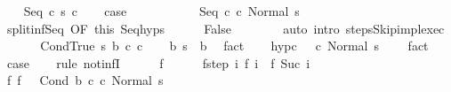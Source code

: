 \begin{isabellebody}
\isamarkupfalse%
\isanewline
\ \ \isamarkupfalse%
\ {\isacharparenleft}Seq\ c\ s\ c\isanewline
\ \ \isamarkupfalse%
\ {\isacharquery}case\isanewline
\ \ \isamarkupfalse%
\ \isanewline
\ \ \ \ \isamarkupfalse%
\ {\isachardoublequoteopen}{\isasymGamma}{\isasymturnstile}\ {\isacharparenleft}Seq\ c\ c\ Normal\ s{\isacharparenright}\ {\isasymrightarrow}\ {\isasymdots}{\isacharparenleft}{\isasyminfinity}{\isacharparenright}{\isachardoublequoteclose}\isanewline
\ \ \ \ \isamarkupfalse%
\ split{\isacharunderscore}inf{\isacharunderscore}Seq\ {\isacharbrackleft}OF\ this{\isacharbrackright}\ Seq{\isachardot}hyps\isanewline
\ \ \ \ \isamarkupfalse%
\ False\isanewline
\ \ \ \ \ \ \isamarkupfalse%
\ {\isacharparenleft}auto\ intro{\isacharcolon}\ steps{\isacharunderscore}Skip{\isacharunderscore}impl{\isacharunderscore}exec{\isacharparenright}\isanewline
\ \ \isamarkupfalse%
\isanewline
{}\isamarkupfalse%
\isanewline
\ \ \isamarkupfalse%
\ {\isacharparenleft}CondTrue\ s\ b\ c{}\ c{}{\isacharparenright}\isanewline
\ \ \isamarkupfalse%
\ b{\isacharcolon}\ {\isachardoublequoteopen}s\ {\isasymin}\ b{\isachardoublequoteclose}\ \isamarkupfalse%
\ fact\isanewline
\ \ \isamarkupfalse%
\ hyp{\isacharunderscore}c{}{\isacharcolon}\ {\isachardoublequoteopen}{\isasymnot}\ {\isasymGamma}{\isasymturnstile}\ {\isacharparenleft}c{}{\isacharcomma}\ Normal\ s{\isacharparenright}\ {\isasymrightarrow}\ {\isasymdots}{\isacharparenleft}{\isasyminfinity}{\isacharparenright}{\isachardoublequoteclose}\ \isamarkupfalse%
\ fact\isanewline
\ \ \isamarkupfalse%
\ {\isacharquery}case\isanewline
\ \ \isamarkupfalse%
\ {\isacharparenleft}rule\ not{\isacharunderscore}infI{\isacharparenright}\isanewline
\ \ \ \ \isamarkupfalse%
\ f\isanewline
\ \ \ \ \isamarkupfalse%
\ f{\isacharunderscore}step{\isacharcolon}\ {\isachardoublequoteopen}{\isasymAnd}i{\isachardot}\ {\isasymGamma}{\isasymturnstile}f\ i\ {\isasymrightarrow}\ f\ {\isacharparenleft}Suc\ i{\isacharparenright}{\isachardoublequoteclose}\isanewline
\ \ \ \ \isamarkupfalse%
\ f{\isacharunderscore}{}{\isacharcolon}\ {\isachardoublequoteopen}f\ {}\ {\isacharequal}\ {\isacharparenleft}Cond\ b\ c{}\ c{}{\isacharcomma}\ Normal\ s{\isacharparenright}{\isachardoublequoteclose}\ \isanewline

\end{isabellebody}
